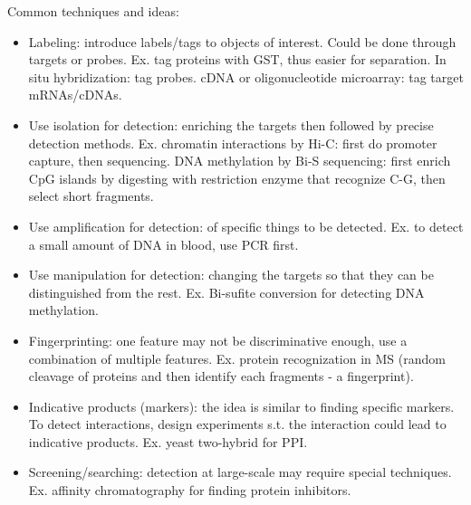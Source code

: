\documentclass{report}
\begin{document}
Common techniques and ideas: 
\begin{itemize}
	\item Labeling: introduce labels/tags to objects of interest. Could be done through targets or probes. Ex. tag proteins with GST, thus easier for separation. In situ hybridization: tag probes. cDNA or oligonucleotide microarray: tag target mRNAs/cDNAs.
	
	\item Use isolation for detection: enriching the targets then followed by precise detection methods. Ex. chromatin interactions by Hi-C: first do promoter capture, then sequencing. DNA methylation by Bi-S sequencing: first enrich CpG islands by digesting with restriction enzyme that recognize C-G, then select short fragments. 
	
	\item Use amplification for detection: of specific things to be detected. Ex. to detect a small amount of DNA in blood, use PCR first. 
	
	\item Use manipulation for detection: changing the targets so that they can be distinguished from the rest. Ex. Bi-sufite conversion for detecting DNA methylation. 
	
	\item Fingerprinting: one feature may not be discriminative enough, use a combination of multiple features. Ex. protein recognization in MS (random cleavage of proteins and then identify each fragments - a fingerprint). 
	
	\item Indicative products (markers): the idea is similar to finding specific markers. To detect interactions, design experiments s.t. the interaction could lead to indicative products. Ex. yeast two-hybrid for PPI. 
	
	\item Screening/searching: detection at large-scale may require special techniques. Ex. affinity chromatography for finding protein inhibitors. 
\end{itemize} 
\end{document}
